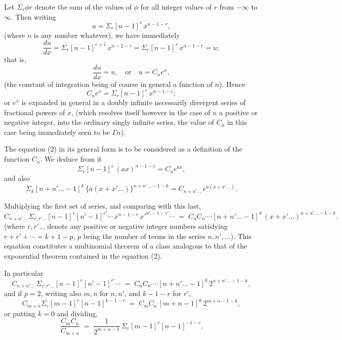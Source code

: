 \documentclass[11pt]{article}
\begin{document}
Let $\Sigma_r \phi r$ denote the sum of the values of $\phi$ for all integer values of $r$ from $-\infty$ to $\infty$. Then writing
\begin{equation}
u = \Sigma_r [n-1]^r\, x^{n-1-r},
\end{equation}
(where $n$ is any number whatever), we have immediately
\[ \frac{du}{dx} = \Sigma_r [n-1]^{r+1}\, x^{n-2-r} = \Sigma_r [n-1]^r\, x^{n-1-r} = u; \]
that is,
\[ \frac{du}{dx} = u, \quad\text{or}\quad u = C_n e^x, \]
(the constant of integration being of course in general a function of $n$). Hence
\begin{equation}
C_n e^x = \Sigma_r [n-1]^r\, x^{n-1-r};
\end{equation}
or $e^x$ is expanded in general in a doubly infinite necessarily divergent series of fractional powers of $x$, (which resolves itself however in the case of $n$ a positive or negative integer, into the ordinary singly infinite series, the value of $C_n$ in this case being immediately seen to be $\Gamma n$).

The equation (2) in its general form is to be considered as a definition of the function $C_n$. We deduce from it
\[ \Sigma_r [n-1]^r\, (ax)^{n-1-r} = C_n e^{ax}, \]
and also
\[ \Sigma_k [n+n'\ldots-1]^k\, \{a(x+x'\ldots)\}^{n+n'\ldots-1-k} = C_{n+n'\ldots}\, e^{a(x+x'\ldots)}. \]

Multiplying the first set of series, and comparing with this last,
\begin{equation}
C_{n+n'\ldots}\,\Sigma_{r,r'\ldots} [n-1]^r [n'-1]^{r'}\!\cdots\, x^{n-1-r}\, x'^{n'-1-r'}\!\cdots \;=\; C_n C_{n'}\!\cdots [n+n'\ldots-1]^k\,(x+x'\ldots)^{n+n'\ldots-1-k},
\end{equation}
(where $r,r'\ldots$ denote any positive or negative integer numbers satisfying $r+r'+\cdots = k+1-p$, $p$ being the number of terms in the series $n,n',\ldots$). This equation constitutes a multinomial theorem of a class analogous to that of the exponential theorem contained in the equation (2).

In particular
\begin{equation}
C_{n+n'\ldots}\,\Sigma_{r,r'\ldots} [n-1]^r [n'-1]^{r'}\!\cdots \;=\; C_n C_{n'}\!\cdots [n+n'\ldots-1]^k\, 2^{n+n'\ldots-1-k},
\end{equation}
and if $p=2$, writing also $m,n$ for $n,n'$, and $k-1-r$ for $r'$,
\begin{equation}
C_{m+n}\Sigma_r [m-1]^r [n-1]^{k-1-r} \;=\; C_m C_n\, [m+n-1]^k\, 2^{m+n-1-k},
\end{equation}
or putting $k=0$ and dividing,
\begin{equation}
\frac{C_m C_n}{C_{m+n}} \;=\; \frac{1}{2^{m+n-1}}\,\Sigma_r [m-1]^r [n-1]^{-1-r}.
\end{equation}
\end{document}
